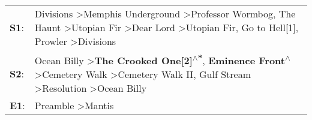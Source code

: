 \begin{supertabular}{p{0.03\textwidth}p{0.92\textwidth}}
 \textbf{S1}:  &  Divisions\textsuperscript{} \textgreater \enspace Memphis Underground\textsuperscript{} \textgreater \enspace Professor Wormbog\textsuperscript{}, \enspace The Haunt\textsuperscript{} \textgreater \enspace Utopian Fir\textsuperscript{} \textgreater \enspace Dear Lord\textsuperscript{} \textgreater \enspace Utopian Fir\textsuperscript{}, \enspace Go to Hell[1]\textsuperscript{}, \enspace Prowler\textsuperscript{} \textgreater \enspace Divisions\textsuperscript{}  \enspace  \\
 \textbf{S2}:  &                                               Ocean Billy\textsuperscript{} \textgreater \enspace \textbf{The Crooked One[2]\textsuperscript{$\wedge$*}}, \enspace \textbf{Eminence Front\textsuperscript{$\wedge$}} \textgreater \enspace Cemetery Walk\textsuperscript{} \textgreater \enspace Cemetery Walk II\textsuperscript{}, \enspace Gulf Stream\textsuperscript{} \textgreater \enspace Resolution\textsuperscript{} \textgreater \enspace Ocean Billy\textsuperscript{}  \enspace  \\
 \textbf{E1}:  &                                                                                                                                                                                                                                                                                                                                                                                                          Preamble\textsuperscript{} \textgreater \enspace Mantis\textsuperscript{}  \enspace  \\
\end{supertabular}
